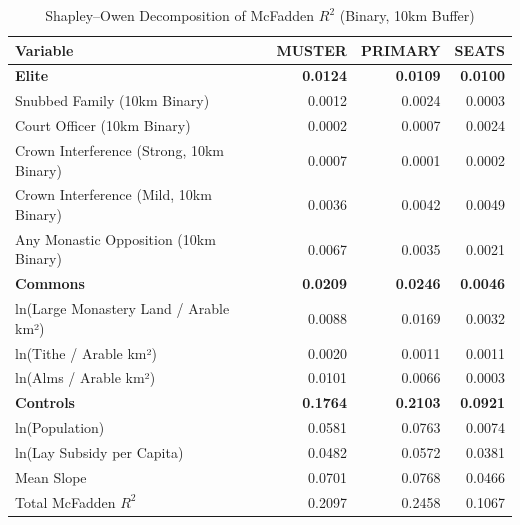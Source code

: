 \begin{table}[H]
\centering
\caption{Shapley--Owen Decomposition of McFadden $R^2$ (Binary, 10km Buffer)}
\label{tab:shapley_owen_bin}
\begin{tabular}{lrrr}
\hline\hline
Variable & MUSTER & PRIMARY & SEATS \\
\hline
\textbf{Elite} & \textbf{0.0124} & \textbf{0.0109} & \textbf{0.0100} \\
\quad Snubbed Family (10km Binary) & 0.0012 & 0.0024 & 0.0003 \\
\quad Court Officer (10km Binary) & 0.0002 & 0.0007 & 0.0024 \\
\quad Crown Interference (Strong, 10km Binary) & 0.0007 & 0.0001 & 0.0002 \\
\quad Crown Interference (Mild, 10km Binary) & 0.0036 & 0.0042 & 0.0049 \\
\quad Any Monastic Opposition (10km Binary) & 0.0067 & 0.0035 & 0.0021 \\
\textbf{Commons} & \textbf{0.0209} & \textbf{0.0246} & \textbf{0.0046} \\
\quad ln(Large Monastery Land / Arable km²) & 0.0088 & 0.0169 & 0.0032 \\
\quad ln(Tithe / Arable km²) & 0.0020 & 0.0011 & 0.0011 \\
\quad ln(Alms / Arable km²) & 0.0101 & 0.0066 & 0.0003 \\
\textbf{Controls} & \textbf{0.1764} & \textbf{0.2103} & \textbf{0.0921} \\
\quad ln(Population) & 0.0581 & 0.0763 & 0.0074 \\
\quad ln(Lay Subsidy per Capita) & 0.0482 & 0.0572 & 0.0381 \\
\quad Mean Slope & 0.0701 & 0.0768 & 0.0466 \\
\hline
Total McFadden $R^2$ & 0.2097 & 0.2458 & 0.1067 \\
\hline\hline
\end{tabular}
\end{table}

